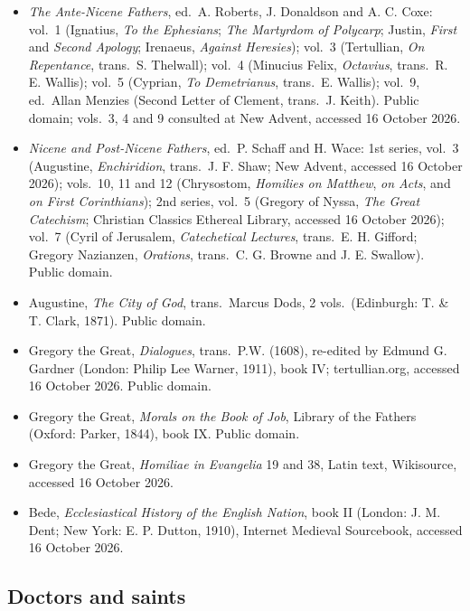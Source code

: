 {\fontsize{8.6}{9.6}\selectfont
\begin{itemize}[itemsep=0pt,parsep=0pt,topsep=0.05em]
\item \emph{The Ante-Nicene Fathers}, ed.\ A. Roberts, J. Donaldson and A. C. Coxe: vol.~1 (Ignatius, \emph{To the Ephesians}; \emph{The Martyrdom of Polycarp}; Justin, \emph{First} and \emph{Second Apology}; Irenaeus, \emph{Against Heresies}); vol.~3 (Tertullian, \emph{On Repentance}, trans.\ S. Thelwall); vol.~4 (Minucius Felix, \emph{Octavius}, trans.\ R. E. Wallis); vol.~5 (Cyprian, \emph{To Demetrianus}, trans.\ E. Wallis); vol.~9, ed.\ Allan Menzies (Second Letter of Clement, trans.\ J. Keith). Public domain; vols.~3, 4 and 9 consulted at New Advent, accessed 16 October 2026.
\item \emph{Nicene and Post-Nicene Fathers}, ed.\ P. Schaff and H. Wace: 1st series, vol.~3 (Augustine, \emph{Enchiridion}, trans.\ J. F. Shaw; New Advent, accessed 16 October 2026); vols.~10, 11 and 12 (Chrysostom, \emph{Homilies on Matthew}, \emph{on Acts}, and \emph{on First Corinthians}); 2nd series, vol.~5 (Gregory of Nyssa, \emph{The Great Catechism}; Christian Classics Ethereal Library, accessed 16 October 2026); vol.~7 (Cyril of Jerusalem, \emph{Catechetical Lectures}, trans.\ E. H. Gifford; Gregory Nazianzen, \emph{Orations}, trans.\ C. G. Browne and J. E. Swallow). Public domain.
\item Augustine, \emph{The City of God}, trans.\ Marcus Dods, 2 vols.\ (Edinburgh: T. \& T. Clark, 1871). Public domain.
\item Gregory the Great, \emph{Dialogues}, trans.\ P.W. (1608), re-edited by Edmund G. Gardner (London: Philip Lee Warner, 1911), book IV; tertullian.org, accessed 16 October 2026. Public domain.
\item Gregory the Great, \emph{Morals on the Book of Job}, Library of the Fathers (Oxford: Parker, 1844), book IX. Public domain.
\item Gregory the Great, \emph{Homiliae in Evangelia} 19 and 38, Latin text, Wikisource, accessed 16 October 2026.
\item Bede, \emph{Ecclesiastical History of the English Nation}, book II (London: J. M. Dent; New York: E. P. Dutton, 1910), Internet Medieval Sourcebook, accessed 16 October 2026.
\end{itemize}}

\subsection*{Doctors and saints}

